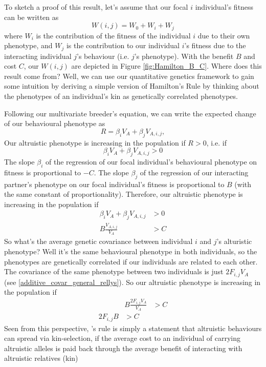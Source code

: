 To sketch a proof of this result, let's assume that our focal $i$ individual's fitness can be written as 
\begin{equation}
W(i,j)= W_0 + W_i +W_j
\end{equation}
where $W_i$ is the contribution of the fitness of the individual $i$ due
to their own phenotype, and $W_j$ is the contribution to our
individual $i$'s fitness due to the interacting individual $j$'s behaviour (i.e. $j$'s phenotype).
With the benefit $B$ and cost $C$, our $W(i,j)$ are depicted in Figure \ref{fig:Hamilton_B_C}. 
Where does this result come from? Well, we can use our quantitative genetics framework to gain some 
intuition by deriving a simple version of Hamilton's Rule by thinking
about the phenotypes of an individual's kin as genetically correlated
phenotypes. 


Following our multivariate breeder's equation, we can write the expected change of our behavioural phenotype as 
\begin{equation}
R = \beta_i V_A + \beta_j V_{A,i,j},
\end{equation}
Our altruistic phenotype is increasing in the population if $R>0$, i.e. if 
\begin{equation}
  \beta_i V_A + \beta_j V_{A,i,j}  > 0 \end{equation}
The slope $\beta_i$ of the regression of our focal individual's
behavioural phenotype on fitness is proportional to $-C$. The slope
$\beta_j$ of the regression of our interacting partner's phenotype on
our focal individual's fitness is proportional to $B$ (with the same
constant of proportionality). Therefore, our altruistic phenotype is increasing in the population if
\begin{eqnarray}
  \beta_i V_A + \beta_j V_{A,i,j} & > 0  \nonumber  \\
 B \frac{V_{A,i,j}}{V_A} & >  C
\end{eqnarray}
So what's the average genetic covariance between
individual $i$ and $j$'s alturistic phenotype? Well it's the same behavioural phenotype in both individuals, so the phenotypes are genetically correlated if our individuals are related to each other. The covariance of the same phenotype between two individuals is just $2 F_{i,j} V_A$ (see \eqref{additive_covar_general_rellys}). So our altruistic phenotype is increasing in the population if 
\begin{eqnarray}
   & B\frac{2 F_{i,j} V_A}{V_A} &> C \nonumber  \\
  2 F_{i,j} B & > C 
\end{eqnarray}
Seen from this perspective, \citeauthor{hamilton1964genetical}'s rule
is simply a statement that altruistic behaviours can spread via
kin-selection, if the average cost to an individual of carrying altruistic alleles is paid back through the average benefit of interacting with altruistic relatives (kin)


